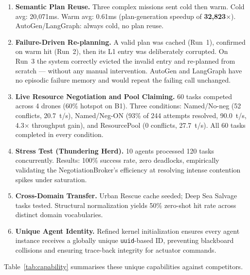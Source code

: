 \documentclass[conference]{IEEEtran}
\begin{document}
\begin{enumerate}
  \item \textbf{Semantic Plan Reuse.} Three complex missions sent cold then warm.
        Cold avg: 20,071ms. Warm avg: 0.61ms (plan-generation speedup of \textbf{32,823$\times$}). 
        AutoGen/LangGraph: always cold, no plan reuse.

  \item \textbf{Failure-Driven Re-planning.} A valid plan was cached (Run~1),
        confirmed on warm hit (Run~2), then its L1 entry was deliberately corrupted.
        On Run~3 the system correctly evicted the invalid entry and re-planned from
        scratch --- without any manual intervention. AutoGen and LangGraph have no
        episodic failure memory and would repeat the failing call unchanged.

  \item \textbf{Live Resource Negotiation and Pool Claiming.} 60 tasks competed across
        4 drones (60\% hotspot on B1). Three conditions: Named/No-neg (52 conflicts,
        20.7~t/s), Named/Neg-ON (93\% of 244 attempts resolved, 90.0~t/s, 4.3$\times$
        throughput gain), and ResourcePool (0 conflicts, 27.7~t/s). All 60 tasks
        completed in every condition.

  \item \textbf{Stress Test (Thundering Herd).} 10 agents processed 120 tasks concurrently.
        Results: 100\% success rate, zero deadlocks, empirically validating the NegotiationBroker's 
        efficiency at resolving intense contention spikes under saturation.

  \item \textbf{Cross-Domain Transfer.} Urban Rescue cache seeded; Deep Sea Salvage
        tasks tested. Structural normalization yields 50\% zero-shot hit rate
        across distinct domain vocabularies.

  \item \textbf{Unique Agent Identity.} Refined kernel initialization ensures every
        agent instance receives a globally unique \texttt{uuid}-based ID, preventing
        blackboard collisions and ensuring trace-back integrity for actuator commands.
\end{enumerate}

Table~\ref{tab:capability} summarises these unique capabilities against competitors.
\end{document}
